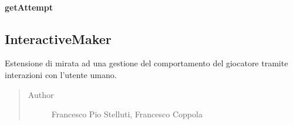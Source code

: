 \documentclass[letterpaper,10pt,italian,openany,oneside]{sphinxmanual}
\begin{document}
\paragraph{getAttempt}
\label{\detokenize{source/it/unicam/cs/pa/mastermind/players/InteractiveBreaker:getattempt}}

\begin{fulllineitems}
\label{\detokenize{source/it/unicam/cs/pa/mastermind/players/InteractiveBreaker:it.unicam.cs.pa.mastermind.players.InteractiveBreaker.getAttempt(InteractionView)}}
\end{fulllineitems}



\subsection{InteractiveMaker}
\label{\detokenize{source/it/unicam/cs/pa/mastermind/players/InteractiveMaker:interactivemaker}}\label{\detokenize{source/it/unicam/cs/pa/mastermind/players/InteractiveMaker::doc}}

\begin{fulllineitems}
\label{\detokenize{source/it/unicam/cs/pa/mastermind/players/InteractiveMaker:it.unicam.cs.pa.mastermind.players.InteractiveMaker}}
Estensione di  mirata ad una gestione del comportamento del giocatore tramite interazioni con l’utente umano.
\begin{quote}\begin{description}
\item[{Author}] \leavevmode
Francesco Pio Stelluti, Francesco Coppola

\end{description}\end{quote}

\end{fulllineitems}
\end{document}
